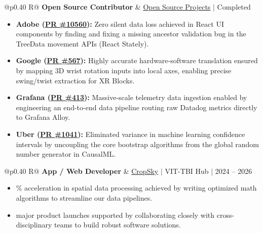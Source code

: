 \documentclass[a4paper,10pt]{article}
\newcommand{\ulink}[2]{\href{#1}{#2}}
\newcommand{\subheading}[1]{{\color[HTML]{0A0A0A}\fontsize{12}{14}\selectfont\bfseries #1}}
\newcommand{\meta}[1]{{\color[HTML]{5C5C5C}\fontsize{10.5}{12.5}\selectfont #1}}
\begin{document}
\begin{tabularx}{\linewidth}{@{}p{0.40\linewidth} R@{}}
\subheading{Open Source Contributor} & \meta{\ulink{https://github.com/su-jin1425/My-Open-Source-Contributions}{Open Source Projects} $|$ Completed}
\end{tabularx}
\begin{itemize}[nosep, leftmargin=1.5em, itemsep=2pt, topsep=2pt]
  \item {\color[HTML]{0A0A0A}\fontsize{11}{14}\selectfont \textbf{Adobe (\ulink{https://github.com/adobe/react-spectrum/pull/10560}{PR \#10560}):} Zero silent data loss achieved in React UI components by finding and fixing a missing ancestor validation bug in the TreeData movement APIs (React Stately).}
  \item {\color[HTML]{0A0A0A}\fontsize{11}{14}\selectfont \textbf{Google (\ulink{https://github.com/google/xrblocks/pull/567}{PR \#567}):} Highly accurate hardware-software translation ensured by mapping 3D wrist rotation inputs into local axes, enabling precise swing/twist extraction for XR Blocks.}
  \item {\color[HTML]{0A0A0A}\fontsize{11}{14}\selectfont \textbf{Grafana (\ulink{https://github.com/grafana/alloy-scenarios/pull/413}{PR \#413}):} Massive-scale telemetry data ingestion enabled by engineering an end-to-end data pipeline routing raw Datadog metrics directly to Grafana Alloy.}
  \item {\color[HTML]{0A0A0A}\fontsize{11}{14}\selectfont \textbf{Uber (\ulink{https://github.com/uber/causalml/pull/1041}{PR \#1041}):} Eliminated variance in machine learning confidence intervals by uncoupling the core bootstrap algorithms from the global random number generator in CausalML.}
\end{itemize}

\begin{tabularx}{\linewidth}{@{}p{0.40\linewidth} R@{}}
\subheading{App / Web Developer} & \meta{\ulink{https://sites.google.com/view/cropsky/home}{CropSky} $|$ VIT-TBI Hub $|$ 2024 -- 2026}
\end{tabularx}
\begin{itemize}[nosep, leftmargin=1.5em, itemsep=2pt, topsep=2pt]
  \item {\color[HTML]{0A0A0A}\fontsize{11}{14}\% acceleration in spatial data processing achieved by writing optimized math algorithms to streamline our data pipelines.}
  \item {\color[HTML]{0A0A0A}\fontsize{11}{14} major product launches supported by collaborating closely with cross-disciplinary teams to build robust software solutions.}
\end{itemize}
\end{document}
